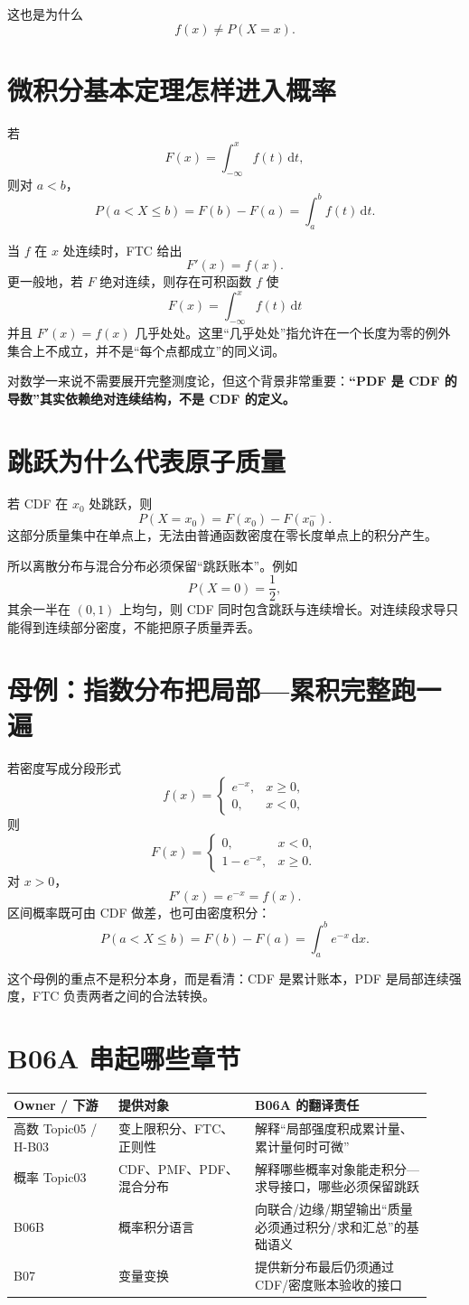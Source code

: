 \documentclass[profile=standard]{ipara-handbook}
\begin{document}
这也是为什么
\[
\boxed{f(x)\neq P(X=x).}
\]

\section{微积分基本定理怎样进入概率}
若
\[
F(x)=\int_{-\infty}^{x}f(t)\,\mathrm{d}t,
\]
则对 $a<b$，
\[
P(a<X\le b)=F(b)-F(a)=\int_a^b f(t)\,\mathrm{d}t.
\]

当 $f$ 在 $x$ 处连续时，FTC 给出
\[
F'(x)=f(x).
\]
更一般地，若 $F$ 绝对连续，则存在可积函数 $f$ 使
\[
F(x)=\int_{-\infty}^{x}f(t)\,\mathrm{d}t
\]
并且 $F'(x)=f(x)$ 几乎处处。这里“几乎处处”指允许在一个长度为零的例外集合上不成立，并不是“每个点都成立”的同义词。

对数学一来说不需要展开完整测度论，但这个背景非常重要：\textbf{“PDF 是 CDF 的导数”其实依赖绝对连续结构，不是 CDF 的定义。}

\section{跳跃为什么代表原子质量}
若 CDF 在 $x_0$ 处跳跃，则
\[
P(X=x_0)=F(x_0)-F(x_0^-).
\]
这部分质量集中在单点上，无法由普通函数密度在零长度单点上的积分产生。

所以离散分布与混合分布必须保留“跳跃账本”。例如
\[
P(X=0)=\frac12,
\]
其余一半在 $(0,1)$ 上均匀，则 CDF 同时包含跳跃与连续增长。对连续段求导只能得到连续部分密度，不能把原子质量弄丢。

\section{母例：指数分布把局部—累积完整跑一遍}
若密度写成分段形式
\[
f(x)=
\begin{cases}
e^{-x},&x\ge0,\\
0,&x<0,
\end{cases}
\]
则
\[
F(x)=
\begin{cases}
0,&x<0,\\
1-e^{-x},&x\ge0.
\end{cases}
\]
对 $x>0$，
\[
F'(x)=e^{-x}=f(x).
\]
区间概率既可由 CDF 做差，也可由密度积分：
\[
P(a<X\le b)=F(b)-F(a)=\int_a^b e^{-x}\,\mathrm{d}x.
\]

这个母例的重点不是积分本身，而是看清：CDF 是累计账本，PDF 是局部连续强度，FTC 负责两者之间的合法转换。

\section{B06A 串起哪些章节}
\begin{tabular}{p{0.23\linewidth}p{0.30\linewidth}p{0.39\linewidth}}
\hline
Owner / 下游 & 提供对象 & B06A 的翻译责任\\
\hline
高数 Topic05 / H-B03 & 变上限积分、FTC、正则性 & 解释“局部强度积成累计量、累计量何时可微”\\
概率 Topic03 & CDF、PMF、PDF、混合分布 & 解释哪些概率对象能走积分—求导接口，哪些必须保留跳跃\\
B06B & 概率积分语言 & 向联合/边缘/期望输出“质量必须通过积分/求和汇总”的基础语义\\
B07 & 变量变换 & 提供新分布最后仍须通过 CDF/密度账本验收的接口\\
\hline
\end{tabular}
\end{document}
